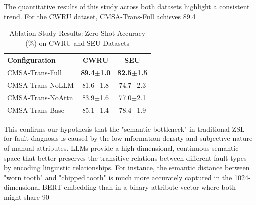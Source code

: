 \documentclass[journal]{IEEEtran}
\begin{document}
The quantitative results of this study across both datasets highlight a consistent trend. For the CWRU dataset, CMSA-Trans-Full achieves 89.4%

\begin{table}[!t]
\centering
\caption{Ablation Study Results: Zero-Shot Accuracy (\%) on CWRU and SEU Datasets}
\label{tab:ablation}
\renewcommand{\arraystretch}{1.2}
\begin{tabular}{lcc}
\toprule
\textbf{Configuration} & \textbf{CWRU} & \textbf{SEU} \\
\midrule
CMSA-Trans-Full & \textbf{89.4$\pm$1.0} & \textbf{82.5$\pm$1.5} \\
CMSA-Trans-NoLLM & 81.6$\pm$1.8 & 74.7$\pm$2.3 \\
CMSA-Trans-NoAttn & 83.9$\pm$1.6 & 77.0$\pm$2.1 \\
CMSA-Trans-Base & 85.1$\pm$1.4 & 78.4$\pm$1.9 \\
\bottomrule
\end{tabular}
\end{table}

This confirms our hypothesis that the "semantic bottleneck" in traditional ZSL for fault diagnosis is caused by the low information density and subjective nature of manual attributes. LLMs provide a high-dimensional, continuous semantic space that better preserves the transitive relations between different fault types by encoding linguistic relationships. For instance, the semantic distance between "worn tooth" and "chipped tooth" is much more accurately captured in the 1024-dimensional BERT embedding than in a binary attribute vector where both might share 90%
\end{document}
